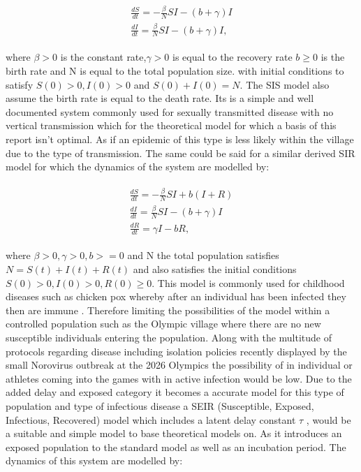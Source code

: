 \documentclass[12pt, oneside]{article}
\begin{document}
\begin{align}
    \begin{split}
    \frac{dS}{dt}=-\frac{\beta}{N}SI-(b+\gamma)I\\
    \frac{dI}{dt}=\frac{\beta}{N}SI-(b+\gamma)I,
    \end{split}
\end{align}

where $\beta > 0$ is the constant rate,$ \gamma > 0 $ is equal to the recovery rate $b \geq 0 $ is the birth rate and N is equal to the total population size. with initial conditions to satisfy $S(0) >0, I(0)>0 $ and $S(0) + I(0)=N $. The SIS model also assume the birth rate is equal to the death rate. \cite{allen2008introduction}  Its is a simple and well documented system commonly used for sexually transmitted disease with no vertical transmission which for the theoretical model for which a basis of this report isn't optimal. As if an epidemic of this type is less likely within the village due to the type of transmission. The same could be said for a similar derived SIR model for which the dynamics of the system are modelled by:

\begin{align}
	\begin{split}
	\frac{dS}{dt} =-\frac{\beta}{N}SI+b(I+R)\\
	\frac{dI}{dt}=\frac{\beta}{N}SI-(b+\gamma)I\\
	\frac{dR}{dt}={\gamma}I-bR,
	\end{split}
\end{align}

where $\beta > 0, \gamma > 0, b >= 0 $ and N the total population satisfies $ N = S(t) + I(t)  + R(t) $ and also satisfies the initial conditions $ S(0) > 0, I(0)> 0, R(0) \geq 0$. This model is commonly used for childhood diseases such as chicken pox whereby after an individual has been infected they then are immune \cite{allen2008introduction}. Therefore limiting the possibilities of the model within a controlled population such as the Olympic village where there are no new susceptible individuals entering the population. Along with the multitude of  protocols regarding disease including isolation policies recently displayed by the small Norovirus outbreak at the 2026 Olympics the possibility of in individual or athletes coming into the games with in active infection would be low. Due to the added delay and exposed category it becomes a accurate model for this type of population and type of infectious disease a SEIR (Susceptible, Exposed, Infectious, Recovered) model which includes a latent delay constant  $\tau$ \cite{yan2006seir}, would be a suitable and simple model to base theoretical models on. As it introduces an exposed population to the standard model as well as an incubation period. The dynamics of this system are modelled by:
\end{document}
